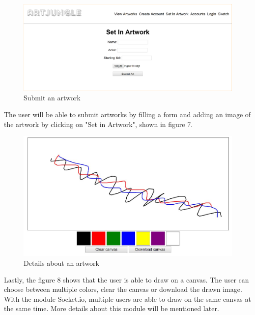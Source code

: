 \newpage
\begin{figure}[h!]
  \centering
  \includegraphics[scale=0.3]{figs/submitartwork.png}
  \caption{Submit an artwork}
\end{figure}

The user will be able to submit artworks by filling a form and adding an image of the artwork by clicking on "Set in Artwork", shown in figure 7. 

\begin{figure}[h!]
  \centering
  \includegraphics[scale=0.5]{figs/sketchApp.JPG}
  \caption{Details about an artwork}
\end{figure}

Lastly, the figure 8 shows that the user is able to draw on a canvas. The user can choose between multiple colors, clear the canvas or download the drawn image. With the module Socket.io, multiple users are able to draw on the same canvas at the same time. More details about this module will be mentioned later.

